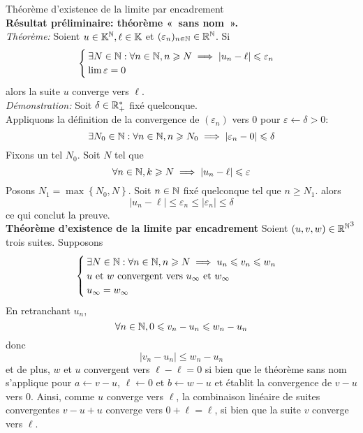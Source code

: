 \documentclass{article}
\renewenvironment{question_kholle}[2][ ]
{
	\subsection{\texorpdfstring{#2}{}}
	\notblank{#1}
	{
		\noindent #1
		\bigbreak
	}
	{}
	\begin{proof}
}
{
	\end{proof}
}
\begin{document}
\begin{question_kholle}{Théorème d’existence de la limite par encadrement}
	\hfill\\
	\textbf{Résultat préliminaire: théorème «~sans nom~».}\\
	\textit{Théorème: } Soient $u\in\mathbb K^{\mathbb N}, \ell\in\mathbb K$ et
	$(\varepsilon_{n})_{n\in\mathbb N}\in\mathbb R^{\mathbb N}$. Si
	\[
		\begin{cases}
			\exists N\in\mathbb N: \forall n\in\mathbb N, n\geqslant N \implies
			|u_{n}-\ell|\leqslant \varepsilon_{n} \\
			\lim \varepsilon=0
		\end{cases}
	\]
	alors la suite $u$ converge vers $\ell$.\\[4pt]
	\textit{Démonstration: }
	Soit $\delta\in\mathbb R_{+}^{*}$ fixé quelconque.\\
	Appliquons la définition de la convergence de $(\varepsilon_{n})$
	vers 0 pour $\varepsilon\leftarrow \delta>0$:
	\[
		\exists N_{0}\in\mathbb N: \forall n\in\mathbb N, n\geqslant N_{0}\implies
		|\varepsilon_{n}-0|\leqslant \delta
	\]
	Fixons un tel $N_{0}$. Soit $N$ tel que
	\[
		\forall n\in\mathbb N, k\geqslant N \implies  |u_{n}-\ell|\leqslant \varepsilon
	\]
	Posons $N_{1}=\max \left\{N_{0}, N\right\}$. Soit $n\in\mathbb N$ fixé
	quelconque tel que $n\geq N_{1}$. alors
	\[
		|u_{n}-\ell|\leq \varepsilon_{n} \leq |\varepsilon_{n}| \leq \delta
	\]
	ce qui conclut la preuve.\\[5pt]

	\noindent\textbf{Théorème d’existence de la limite par encadrement}
	Soient $(u,v,w)\in{\ensuremath{\mathbb R} ^{\ensuremath{\mathbb N} }}^{3}$ trois suites. Supposons
	\[
		\begin{cases}
			\exists N\in\mathbb N:\forall n\in\mathbb N, n\geqslant N \implies u_{n}\leqslant
			v_{n}\leqslant w_{n} \\
			\text{$u$ et $w$ convergent vers $u_{\infty}$ et $w_{\infty}$}
			\\
			u_{\infty} = w_{\infty}
		\end{cases}
	\]
	En retranchant $u_{n}$,
	\[
		\forall n\in\mathbb N, 0\leqslant v_{n}-u_{n}\leqslant w_{n}-u_{n}
	\]
	donc
	\[
		|v_{n}-u_{n}|\leq w_{n}-u_{n}
	\]
	et de plus, $w$ et $u$ convergent vers $\ell-\ell=0$ si bien que le
	théorème sans nom s’applique pour $a\leftarrow v-u$,
	$\ell\leftarrow 0$ et $b\leftarrow w-u$ et établit la convergence
	de $v-u$ vers 0. Ainsi, comme $u$ converge vers $\ell$, la
	combinaison linéaire de suites convergentes $v-u+u$ converge vers
	$0+\ell=\ell$, si bien que la suite $v$ converge vers $\ell$.
\end{question_kholle}
\end{document}
